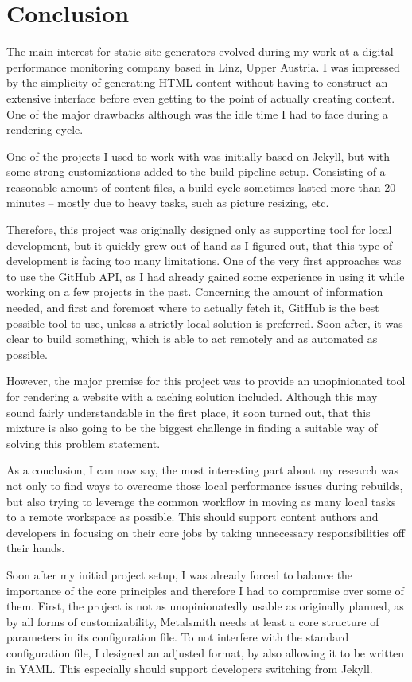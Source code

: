 \chapter{Conclusion}
\label{cha:conclusion}

The main interest for static site generators evolved during my work at a digital performance monitoring company based in Linz, Upper Austria. I was impressed by the simplicity of generating HTML content without having to construct an extensive interface before even getting to the point of actually creating content. One of the major drawbacks although was the idle time I had to face during a rendering cycle.

One of the projects I used to work with was initially based on Jekyll, but with some strong customizations added to the build pipeline setup. Consisting of a reasonable amount of content files, a build cycle sometimes lasted more than 20 minutes -- mostly due to heavy tasks, such as picture resizing, etc.

Therefore, this project was originally designed only as supporting tool for local development, but it quickly grew out of hand as I figured out, that this type of development is facing too many limitations. One of the very first approaches was to use the GitHub API, as I had already gained some experience in using it while working on a few projects in the past. Concerning the amount of information needed, and first and foremost where to actually fetch it, GitHub is the best possible tool to use, unless a strictly local solution is preferred. Soon after, it was clear to build something, which is able to act remotely and as automated as possible.

However, the major premise for this project was to provide an unopinionated tool for rendering a website with a caching solution included. Although this may sound fairly understandable in the first place, it soon turned out, that this mixture is also going to be the biggest challenge in finding a suitable way of solving this problem statement.

As a conclusion, I can now say, the most interesting part about my research was not only to find ways to overcome those local performance issues during rebuilds, but also trying to leverage the common workflow in moving as many local tasks to a remote workspace as possible. This should support content authors and developers in focusing on their core jobs by taking unnecessary responsibilities off their hands.

Soon after my initial project setup, I was already forced to balance the importance of the core principles and therefore I had to compromise over some of them. First, the project is not as unopinionatedly usable as originally planned, as by all forms of customizability, Metalsmith needs at least a core structure of parameters in its configuration file. To not interfere with the standard configuration file, I designed an adjusted format, by also allowing it to be written in YAML. This especially should support developers switching from Jekyll.

